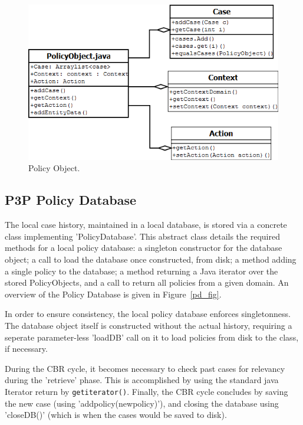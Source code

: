 \begin{figure}[htbp]
\begin{center}
\includegraphics[width = \textwidth]{DesignReport/uml/po.png}
\caption{Policy Object.}
\label{po_fig}
\end{center}
\end{figure}

\subsection{P3P Policy Database}
The local case history, maintained in a local database, is stored via a concrete class implementing 'PolicyDatabase'. This abstract class details the required methods for a local policy database: a singleton constructor for the database object; a call to load the database once constructed, from disk; a method adding a single policy to the database; a method returning a Java iterator over the stored PolicyObjects, and a call to return all policies from a given domain. An overview of the Policy Database is given in Figure~\ref{pd_fig}.

In order to ensure consistency, the local policy database enforces singletonness. The database object itself is constructed without the actual history, requiring a seperate parameter-less 'loadDB' call on it to load policies from disk to the class, if necessary.

During the CBR cycle, it becomes necessary to check past cases for relevancy during the 'retrieve' phase. This is accomplished by using the standard java Iterator return by \texttt{getiterator()}.
Finally, the CBR cycle concludes by saving the new case (using 'addpolicy(newpolicy)'), and closing the database using 'closeDB()' (which is when the cases would be saved to disk).



